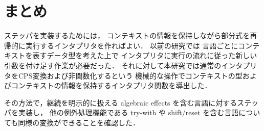 \section{まとめ}
\label{section:conclusion}

ステッパを実装するためには，
コンテキストの情報を保持しながら部分式を再帰的に実行するインタプリタを作ればよい．
以前の研究\cite{FCA19}では
言語ごとにコンテキストを表すデータ型を考えた上で
インタプリタに実行の流れに従った新しい引数を付け足す作業が必要だった．
それに対して本研究では通常のインタプリタをCPS変換および非関数化するという
機械的な操作でコンテキストの型およびコンテキストの情報を保持するインタプリタ関数を導出した．

その方法で，継続を明示的に扱える algebraic effects を含む言語に対するステッパを実装し，
他の例外処理機能である try-with や shift/reset を含む言語についても同様の変換ができることを確認した．
